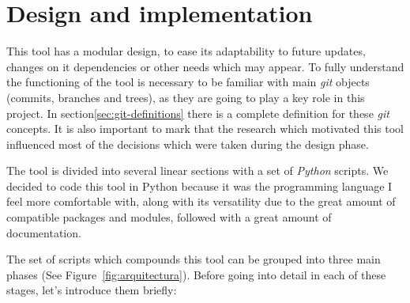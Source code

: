 \documentclass[a4paper, 12pt]{book}
\begin{document}
\chapter{Design and implementation}
\label{sec:design-implementation}
This tool has a modular design, to ease its adaptability to future updates, changes on it dependencies or other needs which may appear.
To fully understand the functioning of the tool is necessary to be familiar with main \emph{git} objects (commits, branches and trees),
as they are going to play a key role in this project. In section\ref{sec:git-definitions} there is a complete definition for these \emph{git} concepts.
It is also important to mark that the research which motivated this tool influenced most of the decisions which were taken during the design phase.\par
The tool is divided into several linear sections with a set of \emph{Python} scripts. We decided to code this tool in Python because it was the programming
language I feel more comfortable with, along with its versatility due to the great amount of compatible packages and modules, followed
with a great amount of documentation.\par
The set of scripts which compounds this tool can be grouped into three main phases (See Figure~\ref{fig:arquitectura}).
Before going into detail in each of these stages, let's introduce them briefly:
\end{document}

